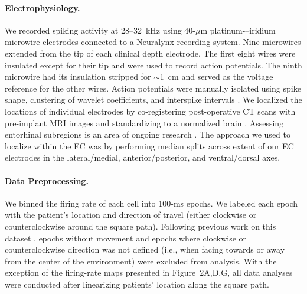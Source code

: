 \paragraph{Electrophysiology.}  We recorded spiking activity at 28--32~kHz using 40-$\mu$m platinum-–iridium microwire electrodes \citep{FrieEtal99} connected to a Neuralynx recording system. Nine microwires extended from the tip of each clinical depth electrode. The first eight wires were insulated except for their tip and were used to record action potentials. The ninth microwire had its insulation stripped for $\sim$1~cm and served as the voltage reference for the other  wires. Action potentials were manually isolated using spike shape, clustering of wavelet coefficients, and interspike intervals \citep{QuirEtal04}.  We localized the locations of individual electrodes by co-registering post-operative CT scans with pre-implant MRI images and standardizing to a normalized brain \cite{TalaTour88}.  Assessing  entorhinal subregions is an  area of ongoing research \cite{KhanEtal14}. The approach we used to localize within the EC was by performing median splits across extent of our EC electrodes in the lateral/medial, anterior/posterior, and ventral/dorsal axes. %


\paragraph{Data Preprocessing.} We binned the firing rate of each cell into 100-ms epochs. We labeled each epoch with the patient's location and direction of travel (either clockwise or counterclockwise around the square path). Following previous work on this dataset \cite{JacoEtal07,JacoEtal10}, epochs without movement and epochs where clockwise or counterclockwise direction was not defined (i.e., when facing towards or away from the center of the environment) were excluded from analysis. With the exception of the firing-rate maps presented in Figure~2A,D,G, all data analyses were conducted after linearizing patients' location along the square path.   


